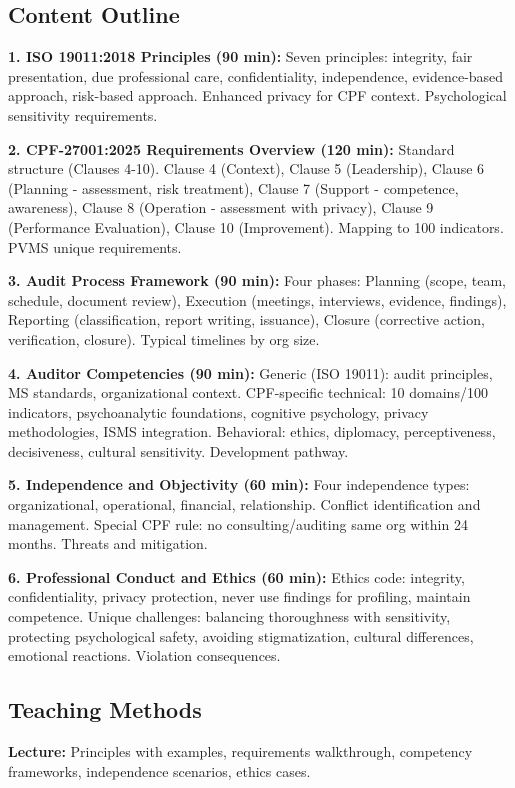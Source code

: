 \documentclass[11pt,a4paper]{article}
\begin{document}
\subsection{Content Outline}

\textbf{1. ISO 19011:2018 Principles (90 min):} Seven principles: integrity, fair presentation, due professional care, confidentiality, independence, evidence-based approach, risk-based approach. Enhanced privacy for CPF context. Psychological sensitivity requirements.

\textbf{2. CPF-27001:2025 Requirements Overview (120 min):} Standard structure (Clauses 4-10). Clause 4 (Context), Clause 5 (Leadership), Clause 6 (Planning - assessment, risk treatment), Clause 7 (Support - competence, awareness), Clause 8 (Operation - assessment with privacy), Clause 9 (Performance Evaluation), Clause 10 (Improvement). Mapping to 100 indicators. PVMS unique requirements.

\textbf{3. Audit Process Framework (90 min):} Four phases: Planning (scope, team, schedule, document review), Execution (meetings, interviews, evidence, findings), Reporting (classification, report writing, issuance), Closure (corrective action, verification, closure). Typical timelines by org size.

\textbf{4. Auditor Competencies (90 min):} Generic (ISO 19011): audit principles, MS standards, organizational context. CPF-specific technical: 10 domains/100 indicators, psychoanalytic foundations, cognitive psychology, privacy methodologies, ISMS integration. Behavioral: ethics, diplomacy, perceptiveness, decisiveness, cultural sensitivity. Development pathway.

\textbf{5. Independence and Objectivity (60 min):} Four independence types: organizational, operational, financial, relationship. Conflict identification and management. Special CPF rule: no consulting/auditing same org within 24 months. Threats and mitigation.

\textbf{6. Professional Conduct and Ethics (60 min):} Ethics code: integrity, confidentiality, privacy protection, never use findings for profiling, maintain competence. Unique challenges: balancing thoroughness with sensitivity, protecting psychological safety, avoiding stigmatization, cultural differences, emotional reactions. Violation consequences.

\subsection{Teaching Methods}
\textbf{Lecture:} Principles with examples, requirements walkthrough, competency frameworks, independence scenarios, ethics cases.
\end{document}
